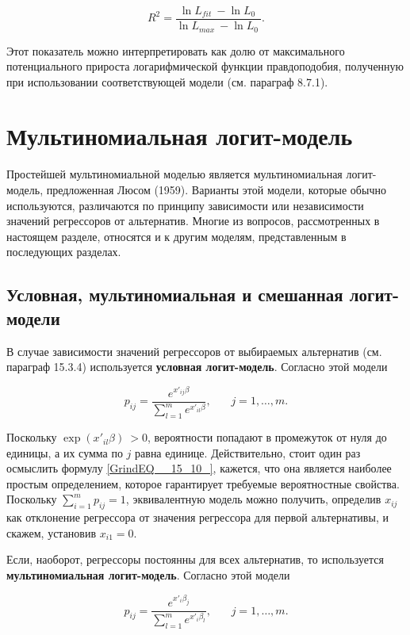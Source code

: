\[R^2=\frac{{\ln  L_{fit}\ }-{\ln  L_0\ }}{{\ln  L_{max}\ }-{\ln  L_0\ }}.\] 

Этот показатель можно интерпретировать как долю от максимального потенциального прироста логарифмической функции правдоподобия, полученную при использовании соответствующей модели (см. параграф 8.7.1).

\section{Мультиномиальная логит-модель}

Простейшей мультиномиальной моделью является мультиномиальная логит-модель, предложенная Люсом (1959). Варианты этой модели, которые обычно используются, различаются по принципу зависимости или независимости значений регрессоров от альтернатив. Многие из вопросов, рассмотренных в настоящем разделе, относятся и к другим моделям, представленным в последующих разделах.

\subsection{Условная, мультиномиальная и смешанная логит-модели}

В случае зависимости значений регрессоров от выбираемых альтернатив (см. параграф 15.3.4) используется \textbf{условная логит-модель}. Согласно этой модели

\begin{equation} \label{GrindEQ__15_10_} p_{ij}=\frac{e^{x'_{ij}\beta }}{\sum^m_{l=1}{e^{x'_{il}\beta }}},\ \ \ \ \ \ \ \ j=1,\dots ,m. \end{equation} 

Поскольку ${\exp  \left(x'_{il}\beta \right)\ }>0$, вероятности попадают в промежуток от нуля до единицы, а их сумма по $j$ равна единице. Действительно, стоит один раз осмыслить формулу \eqref{GrindEQ__15_10_}, кажется, что она является наиболее простым определением, которое гарантирует требуемые вероятностные свойства. Поскольку $\sum^m_{i=1}{p_{ij}}=1$, эквивалентную модель можно получить, определив $x_{ij}$ как отклонение регрессора от значения регрессора для первой альтернативы, и скажем, установив $x_{i1}=0.$

Если, наоборот, регрессоры постоянны для всех альтернатив, то используется \textbf{мультиномиальная логит-модель}. Согласно этой модели

\begin{equation} \label{GrindEQ__15_11_} p_{ij}=\frac{e^{x'_i{\beta }_j}}{\sum^m_{l=1}{e^{x'_i{\beta }_l}}},\ \ \ \ \ \ \ \ j=1,\dots ,m. \end{equation} 

